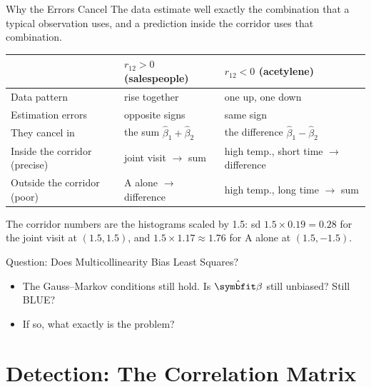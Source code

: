 \begin{frame}{Why the Errors Cancel}
    The data estimate well exactly the combination that a typical observation uses, and a prediction inside the corridor uses that combination.
    \begin{center}
        \footnotesize
        \setlength{\tabcolsep}{4pt}
        \begin{tabular}{lll}
            \toprule
            & $r_{12}>0$ (salespeople) & $r_{12}<0$ (acetylene) \\
            \midrule
            Data pattern & rise together & one up, one down \\
            Estimation errors & opposite signs & same sign \\
            They cancel in & the sum $\hat\beta_1+\hat\beta_2$ & the difference $\hat\beta_1-\hat\beta_2$ \\
            Inside the corridor (precise) & joint visit $\to$ sum & high temp., short time $\to$ difference \\
            Outside the corridor (poor) & A alone $\to$ difference & high temp., long time $\to$ sum \\
            \bottomrule
        \end{tabular}
    \end{center}
    The corridor numbers are the histograms scaled by 1.5: sd $1.5\times0.19=0.28$ for the joint visit at $(1.5,1.5)$, and $1.5\times1.17\approx1.76$ for A alone at $(1.5,-1.5)$.
\end{frame}


\begin{frame}{Question: Does Multicollinearity Bias Least Squares?}
    \begin{itemize}
        \item The Gauss--Markov conditions still hold. Is $\hat{\bbeta}$ still unbiased? Still BLUE?
        \item If so, what exactly is the problem?
    \end{itemize}
\end{frame}


\section{Detection: The Correlation Matrix}


